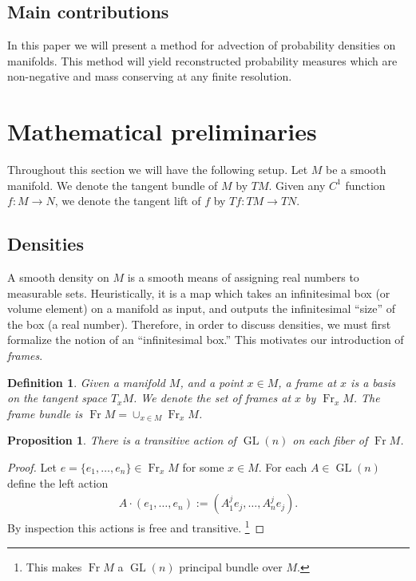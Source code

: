 \documentclass[a4paper, 12 pt]{amsart}
\newtheorem{defn}[thm]{Definition}
\newtheorem{prop}[thm]{Proposition}
\DeclareMathOperator{\Fr}{Fr}
\DeclareMathOperator{\GL}{GL}
\begin{document}
\subsection{Main contributions}
  In this paper we will present a method for advection of
  probability densities on manifolds.
  This method will yield reconstructed probability measures
  which are non-negative and mass conserving at any finite resolution.

\section{Mathematical preliminaries}
\label{sec:math}
  Throughout this section we will have the following
  setup.  Let $M$ be a smooth manifold.
  We denote the tangent bundle of $M$ by $TM$.
  Given any $C^1$ function $f:M \to N$,
  we denote the tangent lift of $f$ by $Tf:TM \to TN$.

\subsection{Densities}
  A smooth density on $M$ is a smooth means of
  assigning real numbers to measurable sets.
  Heuristically, it is a map which
  takes an infinitesimal box (or volume element)
  on a manifold as input, and outputs the infinitesimal ``size''
  of the box (a real number).
  Therefore, in order to discuss densities,
  we must first formalize the notion of an ``infinitesimal box.''
  This motivates our introduction of \emph{frames}.
  \begin{defn}
  \label{eq:frame_bundle}
    Given a manifold $M$, and a point $x \in M$,
    a \emph{frame at $x$} is a basis on the tangent space $T_x M$.
    We denote the set of frames at $x$ by $\Fr_x M$.
    The frame bundle is $\Fr M = \cup_{x \in M} \Fr_x M$.
  \end{defn}

  \begin{prop}
    There is a transitive
    action of $\GL(n)$ on each fiber of $\Fr M$.
  \end{prop}

  \begin{proof}
    Let $e = \{ e_1,\dots,e_n \} \in \Fr_x M$ for some $x \in M$.
    For each $A \in \GL(n)$ define the left action
    \begin{align*}
      A \cdot (e_1,\dots,e_n) := (A^j_1 e_j , \dots, A_n^j e_j ). 
    \end{align*}
    By inspection this actions is free and transitive.
    \footnote{This makes $\Fr M$ a $\GL(n)$ principal bundle over $M$.}
  \end{proof}
\end{document}
